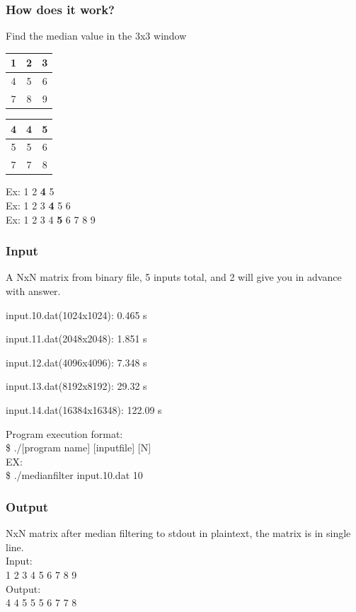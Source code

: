 \documentclass[12pt]{beamer}
\begin{document}
\begin{frame}
  \frametitle{How does it work?}
  Find the median value in the 3x3 window
  \begin{table}
  \begin{tabular}{|c|c|c|} \hline
    1 & 2 & 3 \\ \hline
    4 & 5 & 6 \\ \hline
    7 & 8 & 9 \\ \hline
  \end{tabular}
  \begin{tabular}{|c|c|c|} \hline
    4 & 4 & 5 \\ \hline
    5 & 5 & 6 \\ \hline
    7 & 7 & 8 \\ \hline
  \end{tabular}
  \end{table}
  Ex: 1 2 {\bf 4} 5\\
  Ex: 1 2 3 {\bf 4} 5 6\\
  Ex: 1 2 3 4 {\bf 5} 6 7 8 9
\end{frame}

\begin{frame}
  \frametitle{Input}
  A NxN matrix from binary file, 5 inputs total, and 2 will give you in advance with answer.
  \begin{itemize}
    {\item input.10.dat(1024x1024): 0.465 s}
    {\item input.11.dat(2048x2048): 1.851 s}
    {\item input.12.dat(4096x4096): 7.348 s}
    {\item input.13.dat(8192x8192): 29.32 s}
    {\item input.14.dat(16384x16348): 122.09 s}
  \end{itemize}
  Program execution format:\\
  \$ ./[program name] [inputfile] [N]\\
  EX:\\
  \$ ./medianfilter input.10.dat 10
\end{frame}

\begin{frame}
  \frametitle{Output}
  NxN matrix after median filtering to stdout in plaintext, the matrix is in single line.\\
  Input:\\
  1 2 3 4 5 6 7 8 9\\
  Output:\\
  4 4 5 5 5 6 7 7 8
\end{frame}
\end{document}
